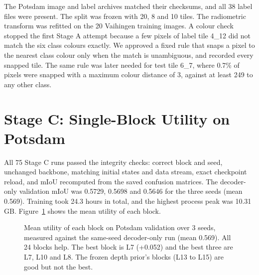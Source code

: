 \documentclass[11pt,a4paper]{report}
\begin{document}
The Potsdam image and label archives matched their checksums, and all 38 label files were present. The split was frozen with 20, 8 and 10 tiles. The radiometric transform was refitted on the 20 Vaihingen training images. A colour check stopped the first Stage A attempt because a few pixels of label tile 4\_12 did not match the six class colours exactly. We approved a fixed rule that snaps a pixel to the nearest class colour only when the match is unambiguous, and recorded every snapped tile. The same rule was later needed for test tile 6\_7, where 0.7\% of pixels were snapped with a maximum colour distance of 3, against at least 249 to any other class.

\section{Stage C: Single-Block Utility on Potsdam}

All 75 Stage C runs passed the integrity checks: correct block and seed, unchanged backbone, matching initial states and data stream, exact checkpoint reload, and mIoU recomputed from the saved confusion matrices. The decoder-only validation mIoU was 0.5729, 0.5698 and 0.5646 for the three seeds (mean 0.569). Training took 24.3 hours in total, and the highest process peak was 10.31 GB. Figure~\ref{fig:utilityc} shows the mean utility of each block.

\begin{figure}[t]
\centering
{}
\caption{Mean utility of each block on Potsdam validation over 3 seeds, measured against the same-seed decoder-only run (mean 0.569). All 24 blocks help. The best block is L7 (+0.052) and the best three are L7, L10 and L8. The frozen depth prior's blocks (L13 to L15) are good but not the best.}
\label{fig:utilityc}
\end{figure}
\end{document}
